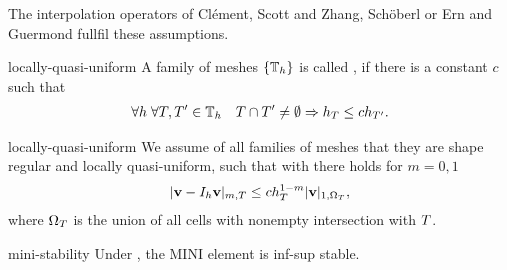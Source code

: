 \begin{remark}
  The interpolation operators of Clément, Scott and Zhang, Schöberl or
  Ern and Guermond fullfil these assumptions.
\end{remark}

\begin{Definition}{locally-quasi-uniform}
  A family of meshes $\{\mathbb T_h\}$ is called , if there is a constant $c$ such that
  \begin{gather}
    \label{eq:stokes:14}
    \forall h
    \;
    \forall T,T'\in \mathbb T_h
    \quad
    T\cap T'\neq \emptyset
    \Rightarrow
    h_T \le c h_{T'}.
  \end{gather}
\end{Definition}

\begin{Assumption}{locally-quasi-uniform}
  We assume of all families of meshes that they are shape regular and
  locally quasi-uniform, such that with
   there holds
  for $m=0,1$
  \begin{gather}
    \label{eq:stokes:15}
    \lvert\mathbf v-I_h \mathbf v\rvert_{m,T} \le c h_T^{1-m} \lvert\mathbf v\rvert_{1,\Omega_T},
  \end{gather}
  where $\Omega_T$ is the union of all cells with nonempty
  intersection with $T$.
\end{Assumption}

\begin{Theorem}{mini-stability}
  Under ,
  the MINI element is inf-sup stable.
\end{Theorem}

